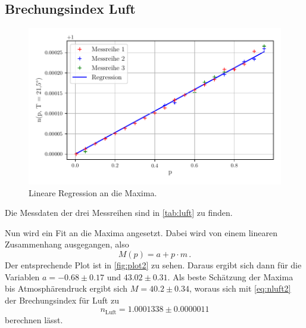 \subsection{Brechungsindex Luft}
\begin{figure}
    \centering
    \includegraphics[width = 0.7 \linewidth]{build/Luft.pdf}
    \caption{Lineare Regression an die Maxima.}
    \label{fig:plot2}
\end{figure}
Die Messdaten der drei Messreihen sind in \autoref{tab:luft} zu finden.

Nun wird ein Fit an die Maxima angesetzt.
Dabei wird von einem linearen Zusammenhang ausgegangen, also
\begin{equation*}
    M(p) = a + p \cdot m \, .
\end{equation*}
Der entsprechende Plot ist in \autoref{fig:plot2} zu sehen.
Daraus ergibt sich dann für die Variablen $a = -0.68 \pm 0.17$ und $43.02 \pm 0.31$.
Als beste Schätzung der Maxima bis Atmosphärendruck ergibt sich $M = 40.2 \pm 0.34$, woraus sich mit \autoref{eq:nluft2} der Brechungsindex für Luft zu
\begin{equation}
    n_\text{Luft} = 1.0001338 \pm 0.0000011
\end{equation}
berechnen lässt.